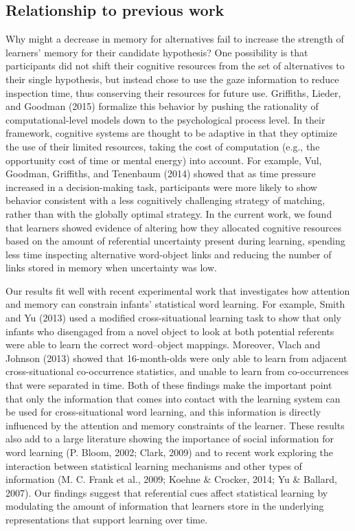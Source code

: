 \documentclass[oneside]{report}
\begin{document}
\subsection{Relationship to previous
work}\label{relationship-to-previous-work}

Why might a decrease in memory for alternatives fail to increase the
strength of learners' memory for their candidate hypothesis? One
possibility is that participants did not shift their cognitive resources
from the set of alternatives to their single hypothesis, but instead
chose to use the gaze information to reduce inspection time, thus
conserving their resources for future use. Griffiths, Lieder, and
Goodman (2015) formalize this behavior by pushing the rationality of
computational-level models down to the psychological process level. In
their framework, cognitive systems are thought to be adaptive in that
they optimize the use of their limited resources, taking the cost of
computation (e.g., the opportunity cost of time or mental energy) into
account. For example, Vul, Goodman, Griffiths, and Tenenbaum (2014)
showed that as time pressure increased in a decision-making task,
participants were more likely to show behavior consistent with a less
cognitively challenging strategy of matching, rather than with the
globally optimal strategy. In the current work, we found that learners
showed evidence of altering how they allocated cognitive resources based
on the amount of referential uncertainty present during learning,
spending less time inspecting alternative word-object links and reducing
the number of links stored in memory when uncertainty was low.

Our results fit well with recent experimental work that investigates how
attention and memory can constrain infants' statistical word learning.
For example, Smith and Yu (2013) used a modified cross-situational
learning task to show that only infants who disengaged from a novel
object to look at both potential referents were able to learn the
correct word--object mappings. Moreover, Vlach and Johnson (2013) showed
that 16-month-olds were only able to learn from adjacent
cross-situational co-occurrence statistics, and unable to learn from
co-occurrences that were separated in time. Both of these findings make
the important point that only the information that comes into contact
with the learning system can be used for cross-situational word
learning, and this information is directly influenced by the attention
and memory constraints of the learner. These results also add to a large
literature showing the importance of social information for word
learning (P. Bloom, 2002; Clark, 2009) and to recent work exploring the
interaction between statistical learning mechanisms and other types of
information (M. C. Frank et al., 2009; Koehne \& Crocker, 2014; Yu \&
Ballard, 2007). Our findings suggest that referential cues affect
statistical learning by modulating the amount of information that
learners store in the underlying representations that support learning
over time.
\end{document}
